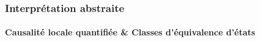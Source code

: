 \begin{frame}
\frametitle{Interprétation abstraite}
\framesubtitle{Causalité locale quantifiée  \& Classes d'équivalence d'états}
\begin{columns}
\begin{column}{0.3\textwidth}
\begin{left}\scalebox{\scaleex}{
\begin{tikzpicture}
\exsanaidef
\end{tikzpicture}
}\end{left}
\end{column}
\begin{column}{0.7\textwidth}





\begin{center}\scalebox{\scaleex}{
\exqlcgaidef
}\end{center}

\end{column}
\end{columns}
\end{frame}


